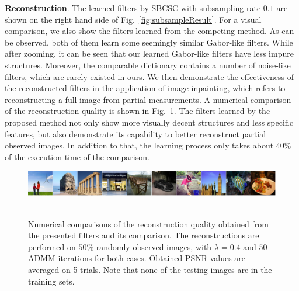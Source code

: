 {\bfseries Reconstruction}. The learned filters by SBCSC with subsampling rate $0.1$ are shown on the right hand side of Fig.\ \ref{fig:subsampleResult}. For a visual comparison, we also show the filters learned from the competing method. As can be observed, both of them learn some seemingly similar Gabor-like filters. While after zooming, it can be seen that our learned Gabor-like filters have less impure structures. Moreover, the comparable dictionary contains a number of noise-like filters, which are rarely existed in ours. We then demonstrate the effectiveness of the reconstructed filters in the application of image inpainting, which refers to reconstructing a full image from partial measurements. A numerical comparison of the reconstruction quality is shown in Fig.\ \ref{fig:PSNRrecon}. The filters learned by the proposed method not only show more visually decent structures and less specific features, but also demonstrate its capability to better reconstruct partial observed images. In addition to that, the learning process only takes about $40\%$ of the execution time of the comparison.

\begin{figure}[h]
    \includegraphics[width=1\textwidth]{figure/reconImage.pdf}
    \\
    \\
    \caption{Numerical comparisons of the reconstruction quality obtained from the presented filters and its comparison. The reconstructions are performed on $50\%$ randomly observed images, with $\lambda = 0.4$ and $50$ ADMM iterations for both cases. Obtained PSNR values are averaged on 5 trials. Note that none of the testing images are in the training sets.} \label{fig:PSNRrecon}
\end{figure}

